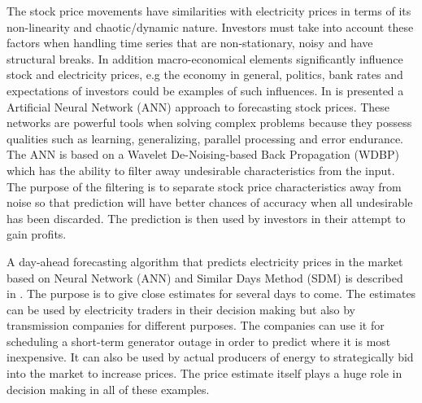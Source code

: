 The stock price movements have similarities with electricity prices in terms of its non-linearity and chaotic/dynamic nature. Investors must take into account these factors when handling time series that are non-stationary, noisy and have structural breaks. In addition macro-economical elements significantly influence stock and electricity prices, e.g the economy in general, politics, bank rates and expectations of investors could be examples of such influences. In \cite{stockForecasting} is presented a Artificial Neural Network (ANN) approach to forecasting stock prices. These networks are powerful tools when solving complex problems because they possess qualities such as learning, generalizing, parallel processing and error endurance. The ANN is based on a Wavelet De-Noising-based Back Propagation (WDBP) which has the ability to filter away undesirable characteristics from the input. The purpose of the filtering is to separate stock price characteristics away from noise so that prediction will have better chances of accuracy when all undesirable has been discarded. The prediction is then used by investors in their attempt to gain profits. 

A day-ahead forecasting algorithm that predicts electricity prices in the market based on Neural Network (ANN) and Similar Days Method (SDM) is described in \cite{pjmForecast}. The purpose is to give close estimates for several days to come. The estimates can be used by electricity traders in their decision making but also by transmission companies for different purposes. The companies can use it for scheduling a short-term generator outage in order to predict where it is most inexpensive. It can also be used by actual producers of energy to strategically bid into the market to increase prices. The price estimate itself plays a huge role in decision making in all of these examples.

